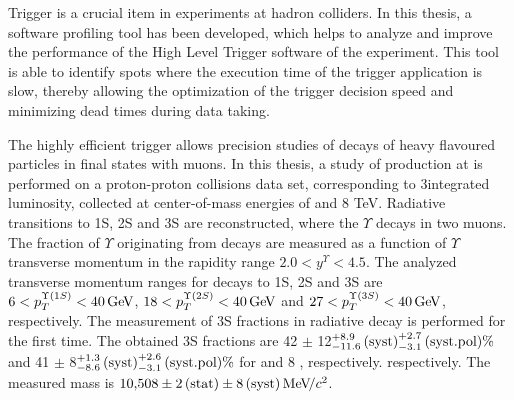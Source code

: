 Trigger is a crucial item in experiments at hadron colliders. In this thesis,  
a software profiling tool has been developed, which helps to analyze and improve the 
performance of the High Level Trigger software of the \lhcb experiment. 
This tool is able to identify spots where the execution time of the trigger application is slow, 
thereby allowing the optimization of the trigger decision speed and minimizing dead times 
during data taking. 

The highly efficient \lhcb trigger allows precision studies 
of decays of heavy flavoured particles in final states with muons.  
In this thesis, a study of \chib production at \lhcb is performed on a proton-proton collisions data set, 
corresponding to 3\invfb integrated luminosity, collected
at center-of-mass energies of  and 8 TeV. Radiative \chib transitions to
\Y1S, \Y2S and \Y3S are reconstructed, where the $\Upsilon$ decays in two muons. 
The fraction of $\Upsilon$ originating from \chib decays
are measured as a function of $\Upsilon$ transverse momentum in the \lhcb rapidity range
$2.0 < y^{\Upsilon} < 4.5$. The analyzed transverse momentum ranges for decays
to \Y1S, \Y2S and \Y3S are $6<p_T^{\Y1S}<40\gev$, $18<p_T^{\Y2S}<40\gev$ and
$27<p_T^{\Y3S}<40\gev$, respectively. The measurement of
\Y3S fractions in radiative \chibThreeP decay is performed for the first time.
The obtained \Y3S fractions are 42 $\pm$ 12\stat${}^{+8.9}_{-11.6}\mathrm{\,(syst)}^{+2.7}_{-3.1}\mathrm{\,(syst.pol)} \%$ and 41 $\pm$ 8\stat${}^{+1.3}_{-8.6}\mathrm{\,(syst)}^{+2.6}_{-3.1}\mathrm{\,(syst.pol)} \%$ for  and 8 \tev, respectively. 
respectively. The measured \chiboneThreeP mass is $10{,}508 \pm 2\mathrm{\,(stat)} \pm
8\mathrm{\,(syst)} {\mathrm{\,Me\kern -0.1em V\!/}c^2}$.


